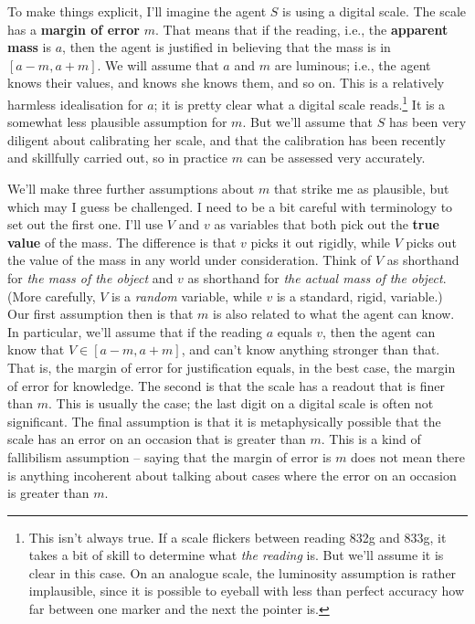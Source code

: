To make things explicit, I'll imagine the agent $S$ is using a digital scale. The scale has a \textbf{margin of error} $m$. That means that if the reading, i.e., the \textbf{apparent mass} is $a$, then the agent is justified in believing that the mass is in $[a-m, a+m]$. We will assume that $a$ and $m$ are luminous; i.e., the agent knows their values, and knows she knows them, and so on. This is a relatively harmless idealisation for $a$; it is pretty clear what a digital scale reads.\footnote{This isn't always true. If a scale flickers between reading 832g and 833g, it takes a bit of skill to determine what \textit{the reading} is. But we'll assume it is clear in this case. On an analogue scale, the luminosity assumption is rather implausible, since it is possible to eyeball with less than perfect accuracy how far between one marker and the next the pointer is.} It is a somewhat less plausible assumption for $m$. But we'll assume that $S$ has been very diligent about calibrating her scale, and that the calibration has been recently and skillfully carried out, so in practice $m$ can be assessed very accurately.

We'll make three further assumptions about $m$ that strike me as plausible, but which may I guess be challenged. I need to be a bit careful with terminology to set out the first one. I'll use $V$ and $v$ as variables that both pick out the \textbf{true value} of the mass. The difference is that $v$ picks it out rigidly, while $V$ picks out the value of the mass in any world under consideration. Think of $V$ as shorthand for \textit{the mass of the object} and $v$ as shorthand for \textit{the actual mass of the object}. (More carefully, $V$ is a \textit{random} variable, while $v$ is a standard, rigid, variable.) Our first assumption then is that $m$ is also related to what the agent can know. In particular, we'll assume that if the reading $a$ equals $v$, then the agent can know that $V \in [a-m, a+m]$, and can't know anything stronger than that. That is, the margin of error for justification equals, in the best case, the margin of error for knowledge. The second is that the scale has a readout that is finer than $m$. This is usually the case; the last digit on a digital scale is often not significant. The final assumption is that it is metaphysically possible that the scale has an error on an occasion that is greater than $m$. This is a kind of fallibilism assumption -- saying that the margin of error is $m$ does not mean there is anything incoherent about talking about cases where the error on an occasion is greater than $m$.

